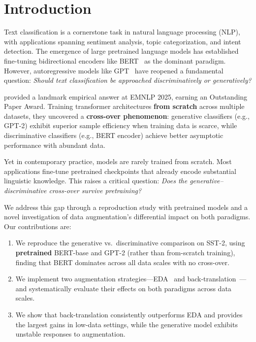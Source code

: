 \documentclass[11pt,a4paper,twocolumn]{article}
\begin{document}
\section{Introduction}

Text classification is a cornerstone task in natural language processing (NLP), with applications spanning sentiment analysis, topic categorization, and intent detection. The emergence of large pretrained language models has established fine-tuning bidirectional encoders like BERT~\cite{devlin2019} as the dominant paradigm. However, autoregressive models like GPT~\cite{radford2019} have reopened a fundamental question: \textit{Should text classification be approached discriminatively or generatively?}

\cite{kasa2025} provided a landmark empirical answer at EMNLP 2025, earning an Outstanding Paper Award. Training transformer architectures \textbf{from scratch} across multiple datasets, they uncovered a \textbf{cross-over phenomenon}: generative classifiers (e.g., GPT-2) exhibit superior sample efficiency when training data is scarce, while discriminative classifiers (e.g., BERT encoder) achieve better asymptotic performance with abundant data.

Yet in contemporary practice, models are rarely trained from scratch. Most applications fine-tune pretrained checkpoints that already encode substantial linguistic knowledge. This raises a critical question: \textit{Does the generative--discriminative cross-over survive pretraining?}

We address this gap through a reproduction study with pretrained models and a novel investigation of data augmentation's differential impact on both paradigms. Our contributions are:

\begin{enumerate}
    \item We reproduce the generative vs.\ discriminative comparison on SST-2, using \textbf{pretrained} BERT-base and GPT-2 (rather than from-scratch training), finding that BERT dominates across all data scales with no cross-over.
    \item We implement two augmentation strategies---EDA~\cite{wei2019} and back-translation~\cite{sennrich2016}---and systematically evaluate their effects on both paradigms across data scales.
    \item We show that back-translation consistently outperforms EDA and provides the largest gains in low-data settings, while the generative model exhibits unstable responses to augmentation.
\end{enumerate}
\end{document}
